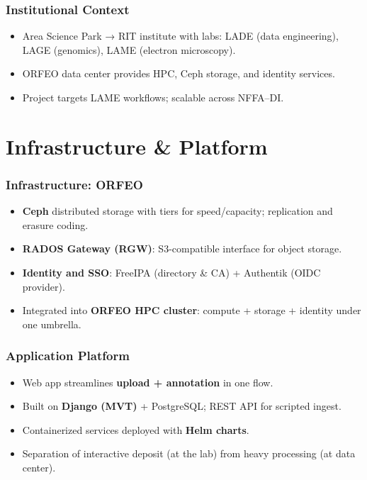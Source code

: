 \documentclass{beamer}
\begin{document}
\begin{frame}
    \frametitle{Institutional Context}
    \begin{itemize}
        \item Area Science Park → RIT institute with labs: LADE (data engineering), LAGE (genomics), LAME (electron microscopy).
        \item ORFEO data center provides HPC, Ceph storage, and identity services.
        \item Project targets LAME workflows; scalable across NFFA–DI.
    \end{itemize}
\end{frame}

\section{Infrastructure \& Platform}

\begin{frame}
	\frametitle{Infrastructure: ORFEO}
	\begin{itemize}
		\item \textbf{Ceph} distributed storage with tiers for speed/capacity; replication and erasure coding.
		\item \textbf{RADOS Gateway (RGW)}: S3-compatible interface for object storage.
		\item \textbf{Identity and SSO}: FreeIPA (directory \& CA) + Authentik (OIDC provider).
		\item Integrated into \textbf{ORFEO HPC cluster}: compute + storage + identity under one umbrella.
	\end{itemize}
\end{frame}

\begin{frame}
	\frametitle{Application Platform}
	\begin{itemize}
		\item Web app streamlines \textbf{upload + annotation} in one flow.
		\item Built on \textbf{Django (MVT)} + PostgreSQL; REST API for scripted ingest.
		\item Containerized services deployed with \textbf{Helm charts}.
		\item Separation of interactive deposit (at the lab) from heavy processing (at data center).
	\end{itemize}
\end{frame}
\end{document}
